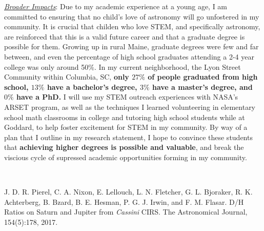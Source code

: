 \underline{\textit{Broader Impacts}}:
Due to my academic experience at a young age, I am committed to
ensuring that no child's love of astronomy will go unfostered in my
community. It is crucial that childen who love STEM, and specifically
astronomy, are reinforced that this is a valid future career and that
a graduate degree is possible for them. Growing up in rural Maine,
graduate degrees were few and far between, and even the percentage of
high school graduates attending a 2-4 year college was only around
50$\%$. In my current neighborhood, the Lyon Street Community within
Columbia, SC, \textbf{only $27\%$ of people graduated from high
school, $13\%$ have a bachelor's degree, $3\%$ have a master's degree,
and $0\%$ have a PhD.} I will use my STEM outreach experiences with
NASA's ARSET program, as well as the techniques I learned volunteering
in elementary school math classrooms in college and tutoring high
school students while at Goddard, to help foster excitement for STEM
in my community. By way of a plan that I outline in my research
statement, I hope to convince these students that \textbf{achieving
higher degrees is possible and valuable}, and break the viscious cycle
of supressed academic opportunities forming in my community.
\noindent\fontsize{10}{14}\selectfont

\

\noindent[1]J. D. R. Pierel, C. A. Nixon, E. Lellouch, L. N. Fletcher, G. L. Bjoraker, R. K. Achterberg, B. Bzard, B. E. Hesman, P. G. J. Irwin, and F. M. Flasar. D/H Ratios on Saturn and Jupiter from \textit{Cassini} CIRS. The Astronomical Journal, 154(5):178, 2017.
\noindent\fontsize{12}{14}\selectfont

